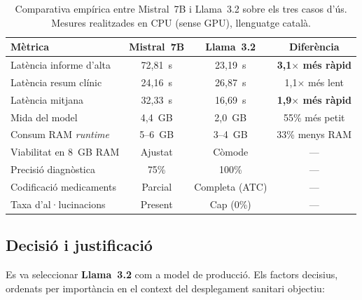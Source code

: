 \documentclass[CAT]{TFUOC}%
\begin{document}
\begin{table}[H]
\centering
\small
\begin{tabular}{lccc}
\hline
\textbf{Mètrica} & \textbf{Mistral~7B} & \textbf{Llama~3.2} & \textbf{Diferència} \\
\hline
Latència informe d'alta & 72,81~s & 23,19~s & \textbf{3,1$\times$ més ràpid} \\
Latència resum clínic & 24,16~s & 26,87~s & 1,1$\times$ més lent \\
Latència mitjana & 32,33~s & 16,69~s & \textbf{1,9$\times$ més ràpid} \\
Mida del model & 4,4~GB & 2,0~GB & 55\% més petit \\
Consum RAM \textit{runtime} & 5--6~GB & 3--4~GB & 33\% menys RAM \\
Viabilitat en 8~GB RAM & Ajustat & Còmode & --- \\
Precisió diagnòstica & 75\% & 100\% & --- \\
Codificació medicaments & Parcial & Completa (ATC) & --- \\
Taxa d'al·lucinacions & Present & Cap (0\%) & --- \\
\hline
\end{tabular}
\caption{Comparativa empírica entre Mistral~7B i Llama~3.2 sobre els tres casos d'ús. Mesures realitzades en CPU (sense GPU), llenguatge català.}
\label{tab:llm-comparison}
\end{table}

\subsection{Decisió i justificació}

Es va seleccionar \textbf{Llama~3.2} com a model de producció. Els factors decisius, ordenats per importància en el context del desplegament sanitari objectiu:
\end{document}
